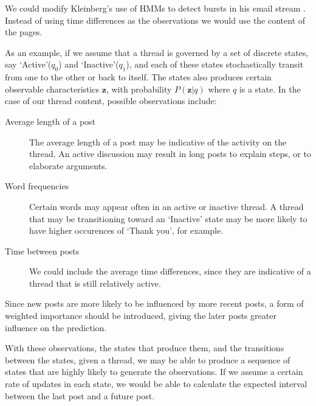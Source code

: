 \documentclass[12 pt]{article}
\begin{document}
We could modify Kleinberg's use of HMMs to detect bursts in his email stream \cite{Kleinberg2003}. Instead of using time differences as the observations we would use the content of the pages.

As an example, if we assume that a thread is governed by a set of discrete states, say `Active'($q_0$) and `Inactive'($q_1$), and each of these states stochastically transit from one to the other or back to itself. The states also produces certain observable characteristics $\mathbf{z}$, with probability $P(\mathbf{z}|q)$ where $q$ is a state. In the case of our thread content, possible observations include:
\begin{description}
	\item[Average length of a post] The average length of a post may be indicative of the activity on the thread. An active discussion may result in long posts to explain steps, or to elaborate arguments.
	\item[Word frequencies] Certain words may appear often in an active or inactive thread. A thread that may be transitioning toward an `Inactive' state may be more likely to have higher occurences of `Thank you', for example.
	\item[Time between posts] We could include the average time differences, since they are indicative of a thread that is still relatively active.
\end{description}
Since new posts are more likely to be influenced by more recent posts, a form of weighted importance should be introduced, giving the later posts greater influence on the prediction.


With these observations, the states that produce them, and the transitions between the states, given a thread, we may be able to produce a sequence of states that are highly likely to generate the observations. If we assume a certain rate of updates in each state, we would be able to calculate the expected interval between the last post and a future post.
\end{document}
